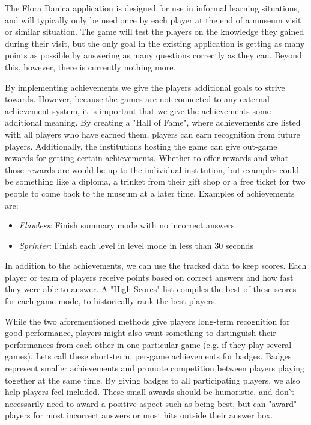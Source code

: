 The Flora Danica application is designed for use in informal learning situations, and will typically only be used once by each player at the end of a museum visit or similar situation. The game will test the players on the knowledge they gained during their visit, but the only goal in the existing application is getting as many points as possible by answering as many questions correctly as they can. Beyond this, however, there is currently nothing more.

By implementing achievements we give the players additional goals to strive towards. However, because the games are not connected to any external achievement system, it is important that we give the achievements some additional meaning. By creating a "Hall of Fame", where achievements are listed with all players who have earned them, players can earn recognition from future players. Additionally, the institutions hosting the game can give out-game rewards for getting certain achievements. Whether to offer rewards and what those rewards are would be up to the individual institution, but examples could be something like a diploma, a trinket from their gift shop or a free ticket for two people to come back to the museum at a later time. Examples of achievements are:
\begin{itemize}
	\item \emph{Flawless}: Finish summary mode with no incorrect answers
	\item \emph{Sprinter}: Finish each level in level mode in less than 30 seconds
\end{itemize}

In addition to the achievements, we can use the tracked data to keep scores. Each player or team of players receive points based on correct answers and how fast they were able to answer. A "High Scores" list compiles the best of these scores for each game mode, to historically rank the best players.

While the two aforementioned methods give players long-term recognition for good performance, players might also want something to distinguish their performances from each other in one particular game (e.g. if they play several games). Lets call these short-term, per-game achievements for badges. Badges represent smaller achievements and promote competition between players playing together at the same time. By giving badges to all participating players, we also help players feel included. These small awards should be humoristic, and don't necessarily need to award a positive aspect such as being best, but can "award" players for most incorrect answers or most hits outside their answer box.

